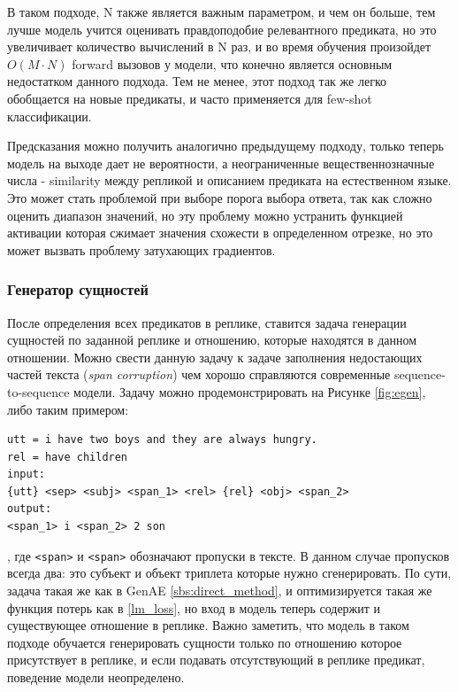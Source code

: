 В таком подходе, N также является важным параметром, и чем он больше, тем лучше модель учится оценивать правдоподобие релевантного предиката, но это увеличивает количество вычислений в N раз, и во время обучения произойдет $O(M \cdotp N)$ forward вызовов у модели, что конечно является основным недостатком данного подхода. Тем не менее, этот подход так же легко обобщается на новые предикаты, и часто применяется для few-shot классификации.

Предсказания можно получить аналогично предыдущему подходу, только теперь модель на выходе дает не вероятности, а неограниченные вещественнозначные числа - similarity между репликой и описанием предиката на естественном языке. Это может стать проблемой при выборе порога выбора ответа, так как сложно оценить диапазон значений, но эту проблему можно устранить функцией активации которая сжимает значения схожести в определенном отрезке, но это может вызвать проблему затухающих градиентов.

\subsubsection{Генератор сущностей}

После определения всех предикатов в реплике, ставится задача генерации сущностей по заданной реплике и отношению, которые находятся в данном отношении. Можно свести данную задачу к задаче заполнения недостающих частей текста (\textit{span corruption}) чем хорошо справляются современные sequence-to-sequence модели. Задачу можно продемонстрировать на Рисунке \ref{fig:egen}, либо таким примером:

\begin{verbatim}
utt = i have two boys and they are always hungry.
rel = have children
input:
{utt} <sep> <subj> <span_1> <rel> {rel} <obj> <span_2> 
output:
<span_1> i <span_2> 2 son
\end{verbatim}
, где \texttt{<span>} и \texttt{<span>} обозначают пропуски в тексте. В данном случае пропусков всегда два: это субъект и объект триплета которые нужно сгенерировать. По сути, задача такая же как в GenAE \ref{sbs:direct_method}, и оптимизируется такая же функция потерь как в \ref{lm_loss}, но вход в модель теперь содержит и существующее отношение в реплике. Важно заметить, что модель в таком подходе обучается генерировать сущности только по отношению которое присутствует в реплике, и если подавать отсутствующий в реплике предикат, поведение модели неопределено.

